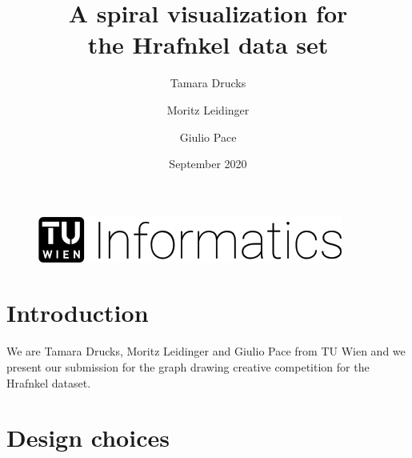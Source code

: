 \documentclass[runningheads]{llncs}
\begin{document}
%
\title{A spiral visualization for \\the Hrafnkel data set}
%
%
\author{Tamara Drucks \and
	Moritz Leidinger \and 
	Giulio Pace}
%




%
%
\date{September 2020}
\maketitle              %
\vspace{-35pt}
\begin{figure}
	\centering
	\includegraphics[width=.3\textwidth]{logo.png}
\end{figure}
\vspace{-25pt}
\section{Introduction}

We are Tamara Drucks, Moritz Leidinger and Giulio Pace from TU Wien and we present our submission for the graph drawing creative competition for the Hrafnkel dataset.


\section{Design choices}
\end{document}
